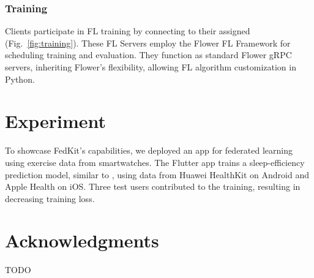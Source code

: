 \documentclass[letterpaper]{article} %
\begin{document}
\subsubsection{Training}
Clients participate in FL training by connecting to their assigned \fs{}
(Fig.~\ref{fig:training}).
These FL Servers employ the Flower FL Framework for
scheduling training and evaluation.
They function as standard Flower gRPC servers,
inheriting Flower's flexibility,
allowing FL algorithm customization in Python.

\section{Experiment}
To showcase FedKit's capabilities,
we deployed an app for federated learning using exercise data from smartwatches.
The Flutter app trains a sleep-efficiency prediction model,
similar to \cite{khoa2022fedmcrnn},
using data from Huawei HealthKit on Android and Apple Health on iOS.
Three test users contributed to the training,
resulting in decreasing training loss.

\appendix

\section*{Acknowledgments}
TODO

\bigskip


\end{document}
